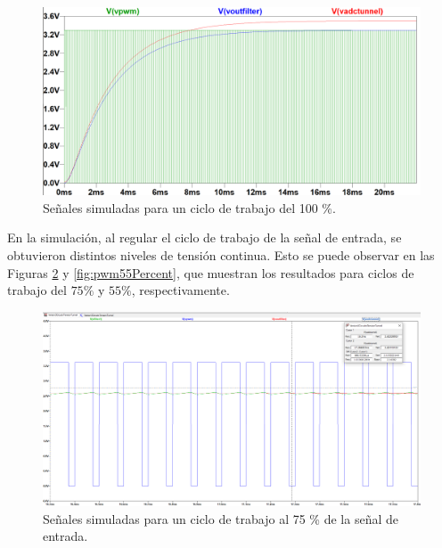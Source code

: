 \begin{figure}[H]
    \centering
    \includegraphics[width=1\linewidth]{Figuras/datalogger/Hardware/pwm100Percent.png}
    \caption{Señales simuladas para un ciclo de trabajo del 100 \%.}
    \label{fig:pwm100Percent}
\end{figure}
En la simulación, al regular el ciclo de trabajo de la señal de entrada, se obtuvieron distintos niveles de tensión continua. Esto se puede observar en las Figuras \ref{fig:pwm75Percent} y \ref{fig:pwm55Percent}, que muestran los resultados para ciclos de trabajo del $75\%$ y $55\%$, respectivamente.

\begin{figure}[H]
    \centering
    \includegraphics[width=1.1\linewidth]{Figuras/datalogger/Hardware/pwm75Percent.png}
    \caption{Señales simuladas para un ciclo de trabajo al 75 \% de la señal de entrada.}
    \label{fig:pwm75Percent}
\end{figure}



